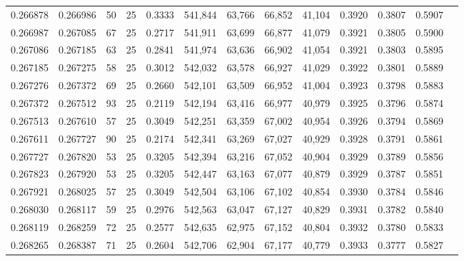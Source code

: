 \begin{tabular}{rrrrrrrrrrrrr}
0.266878 & 0.266986 &    50 &  25 &                                     0.3333 & 541,844 &  63,766 &  66,852 &  41,104 & 0.3920 & 0.3807 & 0.5907 \\
0.266987 & 0.267085 &    67 &  25 &                                     0.2717 & 541,911 &  63,699 &  66,877 &  41,079 & 0.3921 & 0.3805 & 0.5900 \\
0.267086 & 0.267185 &    63 &  25 &                                     0.2841 & 541,974 &  63,636 &  66,902 &  41,054 & 0.3921 & 0.3803 & 0.5895 \\
0.267185 & 0.267275 &    58 &  25 &                                     0.3012 & 542,032 &  63,578 &  66,927 &  41,029 & 0.3922 & 0.3801 & 0.5889 \\
0.267276 & 0.267372 &    69 &  25 &                                     0.2660 & 542,101 &  63,509 &  66,952 &  41,004 & 0.3923 & 0.3798 & 0.5883 \\
0.267372 & 0.267512 &    93 &  25 &                                     0.2119 & 542,194 &  63,416 &  66,977 &  40,979 & 0.3925 & 0.3796 & 0.5874 \\
0.267513 & 0.267610 &    57 &  25 &                                     0.3049 & 542,251 &  63,359 &  67,002 &  40,954 & 0.3926 & 0.3794 & 0.5869 \\
0.267611 & 0.267727 &    90 &  25 &                                     0.2174 & 542,341 &  63,269 &  67,027 &  40,929 & 0.3928 & 0.3791 & 0.5861 \\
0.267727 & 0.267820 &    53 &  25 &                                     0.3205 & 542,394 &  63,216 &  67,052 &  40,904 & 0.3929 & 0.3789 & 0.5856 \\
0.267823 & 0.267920 &    53 &  25 &                                     0.3205 & 542,447 &  63,163 &  67,077 &  40,879 & 0.3929 & 0.3787 & 0.5851 \\
0.267921 & 0.268025 &    57 &  25 &                                     0.3049 & 542,504 &  63,106 &  67,102 &  40,854 & 0.3930 & 0.3784 & 0.5846 \\
0.268030 & 0.268117 &    59 &  25 &                                     0.2976 & 542,563 &  63,047 &  67,127 &  40,829 & 0.3931 & 0.3782 & 0.5840 \\
0.268119 & 0.268259 &    72 &  25 &                                     0.2577 & 542,635 &  62,975 &  67,152 &  40,804 & 0.3932 & 0.3780 & 0.5833 \\
0.268265 & 0.268387 &    71 &  25 &                                     0.2604 & 542,706 &  62,904 &  67,177 &  40,779 & 0.3933 & 0.3777 & 0.5827 \\

\end{tabular}

